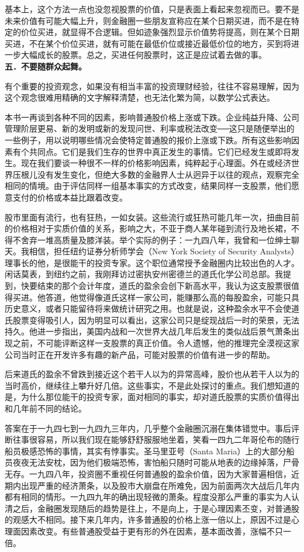 \documentclass[UTF8,a4paper,zihao=-4,fontset = windows]{ctexart} %
\begin{document}
基本上，这个方法一点也没忽视股票的价值，只是表面上看起来忽视而已。要不是未来价值有可能大幅上升，则金融圈一些朋友宣称应在某个日期买进，而不是在特定的价位买进，就显得不合逻辑。但如迹象强烈显示价值势将提高，则在某个日期买进，不在某个价位买进，就有可能在最低价位或接近最低价位的地方，买到将进一步大幅成长的股票。总之，买进任何股票时，这正是应试着去做的事。
\\

\textbf{五．不要随群众起舞。}


有个重要的投资观念，如果没有相当丰富的投资理财经验，往往不容易理解，因为这个观念很难用精确的文字解释清楚，也无法化繁为简，以数学公式表达。

本书一再谈到各种不同的因素，影响普通股价格上涨或下跌。企业纯益升降、公司管理阶层更易、新的发明或新的发现问世、利率或税法改变──这只是随便举出的一些例子，用以说明哪些情况会使特定普通股的报价上涨或下跌。所有这些影响因素有个共同点。它们是我们生存的世界中真正发生的事情。它们已经发生或即将发生。现在我们要谈一种很不一样的价格影响因素，纯粹起于心理面。外在或经济世界压根儿没有发生变化，但绝大多数的金融界人士从迥异于以往的观点，观察完全相同的情境。由于评估同样一组基本事实的方式改变，结果同样一支股票，他们愿意支付的价格或本益比跟着改变。

股市里面有流行，也有狂热，一如女装。这些流行或狂热可能几年一次，扭曲目前的价格相对于实质价值的关系，影响之大，不亚于商人某年碰到流行及地长裙，不得不舍弃一堆高质量及膝洋装。举个实际的例子：一九四八年，我曾和一位绅士聊天。我相信，担任纽约证券分析师学会（New York Society of Security Analysts）理事长的他，是很能干的投资专家。这个职位通常授予金融圈内比较出色的人才。闲话莫表，到纽约之前，我刚拜访过密执安州密德兰的道氏化学公司总部。我提到，快要结束的那个会计年度，道氏的盈余会创下新高水平，我认为这支股票很值得买进。他答道，他觉得像道氏这样一家公司，能赚那么高的每股盈余，可能只具历史意义，或者只能留待将来做统计研究之用。也就是说，这种盈余水平不会使道氏股票变得吸引人，因为明显可以看出，这家公司只是绽现战后一时的荣景，无法持久。他进一步指出，美国内战和一次世界大战几年后发生的类似战后景气萧条出现之前，不可能评断这样一支股票的真正价值。令人遗憾，他的推理完全漠视这家公司当时正在开发许多有趣的新产品，可能对股票的价值有进一步的帮助。

后来道氏的盈余不曾跌到接近这个若干人以为的异常高峰，股价也从若干人以为的当时高价，继续往上攀升好几倍。这些事实，不是此处探讨的重点。我们想知道的是，为什么那位能干的投资专家，面对相同的事实，却对道氏股票的实质价值得出和几年前不同的结论。

答案在于一九四七到一九四九三年内，几乎整个金融圈沉溺在集体错觉中。事后评断往事很容易，所以我们现在能够舒舒服服地坐着，笑看一四九二年哥伦布的随行船员极感恐怖的事情，其实有悖事实。圣马里亚号（Santa Maria）上的大部分船员夜夜无法安枕，因为他们极端恐怖，害怕船只随时可能从地表的边缘掉落，尸骨无存。一九四八年，投资圈不重视任何普通股的盈余价值，因为大家普遍相信，近期内出现严重的经济萧条，以及股市大崩盘在所难免，因为前面两次大战后几年内都有相同的情形。一九四九年的确出现轻微的萧条。程度没那么严重的事实为人认清之后，金融圈发现随后的趋势是往上，不是向上，于是心理因素丕变，对普通股的观感大不相同。接下来几年内，许多普通股的价格上涨一倍以上，原因不过是心理面因素改变。有些普通股受益于更有形的外在因素，基本面改善，涨幅不只一倍。
\end{document}
